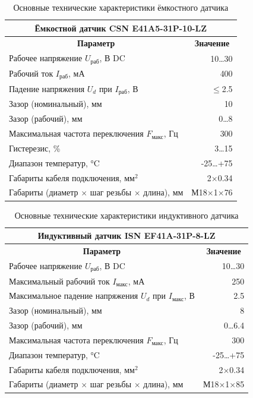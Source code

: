 \documentclass[a4paper]{article}
\begin{document}
\begin{table}[H]
    \caption{Основные технические характеристики ёмкостного датчика}
    \centering
    \begin{tabular}{|l|r|}
        \hline
        \multicolumn{2}{|c|}{\textbf{Ёмкостной датчик CSN E41A5-31P-10-LZ}} \\ \hline\hline
        \multicolumn{1}{|c|}{\textbf{Параметр}} & \multicolumn{1}{|c|}{\textbf{Значение}} \\ \hline
        Рабочее напряжение $U_{\text{раб}}$, В DC & 10\dots 30 \\ \hline
        Рабочий ток $I_{\text{раб}}$, мА & 400 \\ \hline
        Падение напряжения $U_d$ при $I_{\text{раб}}$, В & $\leqslant$2.5 \\ \hline
        Зазор (номинальный), мм & 10 \\ \hline
        Зазор (рабочий), мм & 0\dots 8 \\ \hline
        Максимальная частота переключения $F_{\text{макс}}$, Гц & 300 \\ \hline
        Гистерезис, \% & 3\dots 15 \\ \hline
        Диапазон температур, °C & -25\dots +75 \\ \hline
        Габариты кабеля подключения, мм$^2$ & 2$\times$0.34 \\ \hline
        Габариты (диаметр $\times$ шаг резьбы $\times$ длина), мм & М18$\times$1$\times$76 \\ \hline
    \end{tabular}
    \label{tab:csn}
\end{table}
\begin{table}[H]
    \caption{Основные технические характеристики индуктивного датчика}
    \centering
    \begin{tabular}{|l|r|}
        \hline
        \multicolumn{2}{|c|}{\textbf{Индуктивный датчик ISN EF41A-31P-8-LZ}} \\ \hline\hline
        \multicolumn{1}{|c|}{\textbf{Параметр}} & \multicolumn{1}{|c|}{\textbf{Значение}} \\ \hline
        Рабочее напряжение $U_{\text{раб}}$, В DC & 10\dots 30 \\ \hline
        Максимальный рабочий ток $I_{\text{макс}}$, мА & 250 \\ \hline
        Максимальное падение напряжения $U_d$ при $I_{\text{макс}}$, В & 2.5 \\ \hline
        Зазор (номинальный), мм & 8 \\ \hline
        Зазор (рабочий), мм & 0\dots 6.4 \\ \hline
        Максимальная частота переключения $F_{\text{макс}}$, Гц & 300 \\ \hline
        Диапазон температур, °C & -25\dots +75 \\ \hline
        Габариты кабеля подключения, мм$^2$ & 2$\times$0.34 \\ \hline
        Габариты (диаметр $\times$ шаг резьбы $\times$ длина), мм & М18$\times$1$\times$85 \\ \hline
    \end{tabular}
    \label{tab:isn}
\end{table}
\end{document}
